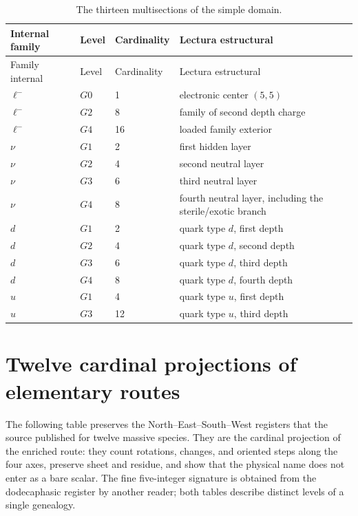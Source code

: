 \begin{longtable}{@{}L{0.22\textwidth}L{0.12\textwidth}L{0.12\textwidth}L{0.46\textwidth}@{}}
\caption{The thirteen multisections of the simple domain.}
\label{tab:trece-multisecciones-catalogo-rev6}\\
\toprule
Internal family & Level & Cardinality & Lectura estructural\\
\midrule
\endfirsthead
\toprule
Family internal & Level & Cardinality & Lectura estructural\\
\midrule
\endhead
\(\ell^-\)&\(G0\)&1&electronic center \((5,5)\)\\
\(\ell^-\)&\(G2\)&8&family of second depth charge\\
\(\ell^-\)&\(G4\)&16&loaded family exterior\\
\(\nu\)&\(G1\)&2&first hidden layer\\
\(\nu\)&\(G2\)&4&second neutral layer\\
\(\nu\)&\(G3\)&6&third neutral layer\\
\(\nu\)&\(G4\)&8&fourth neutral layer, including the sterile/exotic branch\\
\(d\)&\(G1\)&2&quark type \(d\), first depth\\
\(d\)&\(G2\)&4&quark type \(d\), second depth\\
\(d\)&\(G3\)&6&quark type \(d\), third depth\\
\(d\)&\(G4\)&8&quark type \(d\), fourth depth\\
\(u\)&\(G1\)&4&quark type \(u\), first depth\\
\(u\)&\(G3\)&12&quark type \(u\), third depth\\
\bottomrule
\end{longtable}

\iffalse
\section{Twelve cardinal projections of elementary routes}

The following table preserves the North--East--South--West registers that the
source published for twelve massive species. They are the cardinal projection of the
enriched route: they count rotations, changes, and oriented steps along the four
axes, preserve sheet and residue, and show that the physical name does not enter as
a bare scalar. The fine five-integer signature is obtained from the
dodecaphasic register by another reader; both tables describe distinct levels of a
single genealogy.

